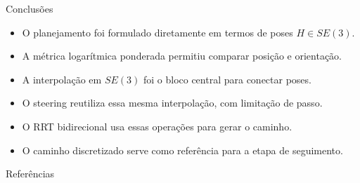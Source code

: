 \documentclass[aspectratio=169]{beamer}
\begin{document}
\begin{frame}{Conclusões}
    \begin{itemize}
        \item O planejamento foi formulado diretamente em termos de poses \(H\in SE(3)\).
        \item A métrica logarítmica ponderada permitiu comparar posição e orientação.
        \item A interpolação em \(SE(3)\) foi o bloco central para conectar poses.
        \item O steering reutiliza essa mesma interpolação, com limitação de passo.
        \item O RRT bidirecional usa essas operações para gerar o caminho.
        \item O caminho discretizado serve como referência para a etapa de seguimento.
    \end{itemize}
\end{frame}

\begin{frame}[allowframebreaks]{Referências}
    \tiny
    
    
\end{frame}
\end{document}
